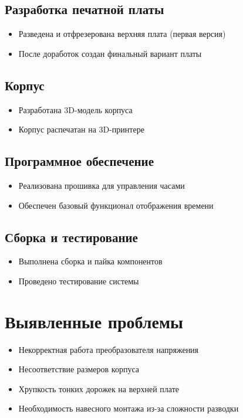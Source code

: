 \documentclass[a4paper,12pt]{article}
\begin{document}
\subsection{Разработка печатной платы}
\begin{itemize}
    \item Разведена и отфрезерована верхняя плата (первая версия)
    \item После доработок создан финальный вариант платы
\end{itemize}

\subsection{Корпус}
\begin{itemize}
    \item Разработана 3D-модель корпуса
    \item Корпус распечатан на 3D-принтере
\end{itemize}

\subsection{Программное обеспечение}
\begin{itemize}
    \item Реализована прошивка для управления часами
    \item Обеспечен базовый функционал отображения времени
\end{itemize}

\subsection{Сборка и тестирование}
\begin{itemize}
    \item Выполнена сборка и пайка компонентов
    \item Проведено тестирование системы
\end{itemize}

\section{Выявленные проблемы}
\begin{itemize}
    \item Некорректная работа преобразователя напряжения
    \item Несоответствие размеров корпуса
    \item Хрупкость тонких дорожек на верхней плате
    \item Необходимость навесного монтажа из-за сложности разводки
\end{itemize}
\end{document}
